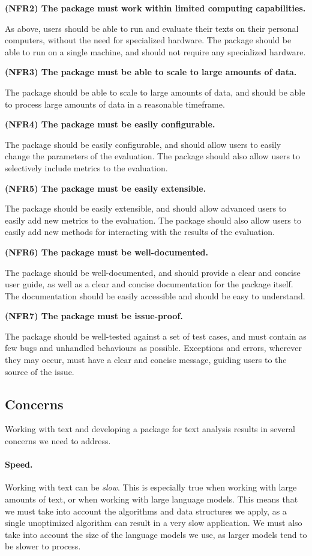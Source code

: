 \textbf{(NFR2) The package must work within limited computing capabilities.}

As above, users should be able to run and evaluate their texts on their personal computers, without the need for specialized hardware. The package should be able to run on a single machine, and should not require any specialized hardware.

\textbf{(NFR3) The package must be able to scale to large amounts of data.}

The package should be able to scale to large amounts of data, and should be able to process large amounts of data in a reasonable timeframe. 

\textbf{(NFR4) The package must be easily configurable.}

The package should be easily configurable, and should allow users to easily change the parameters of the evaluation. The package should also allow users to selectively include metrics to the evaluation.

\textbf{(NFR5) The package must be easily extensible.}

The package should be easily extensible, and should allow advanced users to easily add new metrics to the evaluation. The package should also allow users to easily add new methods for interacting with the results of the evaluation.

\textbf{(NFR6) The package must be well-documented.}

The package should be well-documented, and should provide a clear and concise user guide, as well as a clear and concise documentation for the package itself. The documentation should be easily accessible and should be easy to understand.

\textbf{(NFR7) The package must be issue-proof.}

The package should be well-tested against a set of test cases, and must contain as few bugs and unhandled behaviours as possible. Exceptions and errors, wherever they may occur, must have a clear and concise message, guiding users to the source of the issue.

\subsection{Concerns}

Working with text and developing a package for text analysis results in several concerns we need to address. 

\paragraph{Speed.} Working with text can be \textit{slow}. This is especially true when working with large amounts of text, or when working with large language models. This means that we must take into account the algorithms and data structures we apply, as a single unoptimized algorithm can result in a very slow application. We must also take into account the size of the language models we use, as larger models tend to be slower to process.

